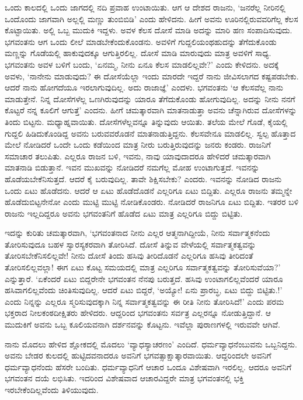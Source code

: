 ಒಂದು ಕಾಲದಲ್ಲಿ ಒಂದು ಜಾಗದಲ್ಲಿ ನದಿ ಪ್ರವಾಹ ಉಂಟಾಯಿತು. ಆಗ ಆ ದೇಶದ ರಾಜನು, `ಜನರೆಲ್ಲ ನೀರಿನಲ್ಲಿ ಒಂದೊಂದು ಜಾಗವಾಗಿ ಅಲ್ಲಲ್ಲಿ ಮಣ್ಣು ತುಂಬಿಬಿಡಿ' ಎಂದು ಹೇಳಿದನು. ಹೀಗೆ ಅವನು ಊರಿನಲ್ಲಿರುವವರಿಗೆಲ್ಲ ಕೆಲಸ ಕೊಟ್ಟಾಯಿತು. ಅಲ್ಲಿ ಒಬ್ಬ ಮುದುಕಿ ಇದ್ದಳು. ಅವಳ ಕೆಲಸ ದೋಸೆ ಮಾಡಿ ಅದನ್ನು ಮಾರಿ ಹಣ ಸಂಪಾದಿಸುವುದು. ಭಗವಂತನು ಆಗ ಒಂದು ಲೀಲೆ ಮಾಡಬೇಕೆಂದುಕೊಂಡನು. ಅವಳಿಗೆ ಗುದ್ದಲಿಯಂಥಹುದನ್ನು ತೆಗೆದುಕೊಂಡು ಮಣ್ಣನ್ನು ಗೊಡೆಯಲ್ಲಿ ಹಾಕುವುದಕ್ಕೂ ಆಗುತ್ತಿರಲಿಲ್ಲ. ದೋಸೆ ಮಾಡಿ ಮಾರುವುದು ಮಾತ್ರ ಅವಳಿಗೆ ಸಾಧ್ಯ. ಭಗವಂತನು ಅವಳ ಬಳಿಗೆ ಬಂದು, `ಏನಮ್ಮ, ನೀನು ಏನೂ ಕೆಲಸ ಮಾಡಲಿಲ್ಲವೇ?' ಎಂದು ಕೇಳಿದನು. ಅದಕ್ಕೆ ಅವಳು, `ನಾನೇನು ಮಾಡುವುದು? ಈ ದೋಸೆಯೆಲ್ಲಾ ಇಂದು ಮಾರದೇ ಇದ್ದರೆ ನಾನು ಜೀವಿಸಲಾಗದ ಕಷ್ಟಪಡಬೇಕು. ಆದರೆ ನಾನು ಹೋಗದೆಯೂ ಇರಲಾಗುವುದಿಲ್ಲ. ಅದು ರಾಜಾಜ್ಞೆ' ಎಂದಳು. ಭಗವಂತನು `ಆ ಕೆಲಸವೆಲ್ಲ ನಾನು ಮಾಡುತ್ತೇನೆ. ನಿನ್ನ ದೋಸೆಗಳೆಲ್ಲ ಒಣಗಿರುವುದನ್ನು ಯಾರೂ ತೆಗೆದುಕೊಂಡು ಹೋಗುವುದಿಲ್ಲ. ಅದನ್ನು ನೀನು ನನಗೆ ಕೊಟ್ಟರೆ ನನ್ನ ಕೂಲಿಗೆ ಆಗುತ್ತೆ' ಎಂದನು. ಹೀಗೆ ಚಮತ್ಕಾರವಾಗಿ ಮಾತನಾಡುತ್ತಾ ಅವನು ಚೆನ್ನಾಗಿರುವ ದೋಸೆಗಳನ್ನು ತಿಂದು ಬಿಟ್ಟನು. ಮಧ್ಯಾಹ್ನವಾಯಿತು. ದೋಸೆಗಳೆಲ್ಲವನ್ನೂ ತಿನ್ನುವುದು ಆಯಿತು. ತಲೆಯ ಮೇಲೆ ಗೊಡೆ, ಕೈಯಲ್ಲಿ ಗುದ್ದಲಿ ಹಿಡಿದುಕೊಂಡಿದ್ದ ಅವನು ಬರುವವರೊಡನೆ ಮಾತನಾಡುತ್ತಿದ್ದನು. ಕೆಲಸವೇನೂ ಮಾಡಲಿಲ್ಲ. ಸ್ವಲ್ಪ ಹೊತ್ತಾದ ಮೇಲೆ ನೋಡಿದರೆ ಒಂದೇ ಒಂದು ಕಡೆಯಿಂದ ಮಾತ್ರ ನೀರು ಬರುತ್ತಿರುವುದನ್ನು ಜನರು ಕಂಡರು. ರಾಜನಿಗೆ ಸಮಾಚಾರ ತಲುಪಿತು. ಎಲ್ಲರೂ ರಾಜನ ಬಳಿ, ಇವನು, ನಾವು ಯಾವುದಾದರೂ ಹೇಳಿದರೆ ಚಮತ್ಕಾರವಾಗಿ ಮಾತನಾಡಿ ಬಿಡುತ್ತಾನೆ. ಇವನ ಮುಖವನ್ನು ನೋಡಿದರೆ ನಮಗೆಲ್ಲ ಮೋಹ ಉಂಟಾಗುತ್ತದೆ. ಇವನನ್ನು ಹೊಡೆಯಬೇಕೆನಿಸುತ್ತದೆ. ಆದರೆ ಕೈ ಬರುವುದಿಲ್ಲ. ತಾವೇ ಶಿಕ್ಷಿಸಬೇಕು? ಎಂದರು. ಇವನನ್ನು ನೋಡಿದ ರಾಜನು ಒಂದು ಏಟು ಹೊಡೆದನು. ಆದರೆ ಆ ಏಟು ಹೊಡೆದೊಡನೆ ಎಲ್ಲರಿಗೂ ಏಟು ಬಿದ್ದಿತು. ಎಲ್ಲರೂ ರಾಜನು ತಮ್ಮನ್ನೇ ಹೊಡೆದುಬಿಟ್ಟನೇನೋ ಎಂದು ಮುಟ್ಟಿ ಮುಟ್ಟಿ ನೋಡಿಕೊಂಡರು. ನೋಡಿದರೆ ರಾಜನಿಗೂ ಏಟು ಬಿದ್ದಿತು. ಇತರರ ಬಳಿ ರಾಜನು ಇಲ್ಲದಿದ್ದರೂ ಅವನು ಭಗವಂತನಿಗೆ ಹೊಡೆದ ಏಟು ಮಾತ್ರ ಎಲ್ಲರಿಗೂ ಬಿದ್ದು ಬಿಟ್ಟಿತು.

ಇದನ್ನು ಕುರಿತು ಚಮತ್ಕಾರವಾಗಿ, `ಭಗವಂತನಾದ ನೀನು ಎಲ್ಲರ ಆತ್ಮನಾಗಿದ್ದೀಯೆ, ನೀನು ಸರ್ವಾತ್ಮಕನೆಂದು ತೋರಿಸುವುದೂ ಬಹಳ ಸ್ವಾರಸ್ಯಕರವಾಗಿ ತೋರಿಸಿದೆ. ದೋಸೆ ತಿನ್ನುವ ವೇಳೆಯಲ್ಲಿ ಸರ್ವಾತ್ಮಕತ್ವವನ್ನು ತೋರಿಸಬೇಕೆನಿಸಲಿಲ್ಲವೇ! ನೀನು ದೋಸೆ ತಿಂದು ಹಸಿವು ತೀರಿದೊಡನೆ ಎಲ್ಲರಿಗೂ ಹಸಿವು ತೀರಿದಂತೆ ತೋರಿಸಲಿಲ್ಲವಲ್ಲಾ! ಈಗ ಏಟು ಕೊಟ್ಟ ಸಮಯದಲ್ಲಿ ಮಾತ್ರ ಎಲ್ಲರಿಗೂ ಸರ್ವಾತ್ಮಕತ್ವವನ್ನು ತೋರಿಸುವೆಯಾ?' ಎನ್ನುತ್ತಾರೆ. `ಏಕೆಂದರೆ ಏಟು ಬಿದ್ದರೇನೇ ಭಗವಂತನ ನೆನಪು ಬರುತ್ತದೆ. ಹಸಿವು ಉಂಟಾಗಲಿಲ್ಲವೆಂದರೆ ಯಾರೂ ಹಸಿವಾಗಲಿಲ್ಲವೆಂದು ಚಿಂತಿಸುವುದಿಲ್ಲ. ಆದರೆ ಏಟು ಬಿದ್ದರೆ, `ಅಯ್ಯೋ! ಏನು ಪ್ರಾರಬ್ಧ, ಏಟು ಬಿದ್ದು ಬಿಟ್ಟಿತು.!' ಎಂದು ನಿನ್ನನ್ನು ಎಲ್ಲರೂ ಸ್ಮರಿಸುವುದಕ್ಕಾಗಿ ನಿನ್ನ ಸರ್ವಾತ್ಮಕತ್ವವನ್ನು ಈ ರೀತಿ ನೀನು ತೋರಿಸಿದೆ!' ಎಂದು ಪರಮ ಭಕ್ತರಾದ ನೀಲಕಂಠದೀಕ್ಷಿತರು ಹೇಳಿದರು. ಆದ್ದರಿಂದ ಭಗವಂತನು ಸರ್ವತ್ರ ಎಲ್ಲರನ್ನೂ ನೋಡುತ್ತಿದ್ದಾನೆ. ಆ ಮುದುಕಿಗೆ ಅವನು ಒಬ್ಬ ಕೂಲಿಯವನಾಗಿ ದರ್ಶನವನ್ನು ಕೊಟ್ಟನು. ಇವೆಲ್ಲಾ ಪುರಾಣಗಳಲ್ಲಿ ಇರುವವೇ ಆಗಿವೆ.

ನಾನು ಮೊದಲು ಹೇಳಿದ ಶ್ಲೋಕದಲ್ಲಿ ಮೊದಲು `ವ್ಯಾಧಸ್ಯಾಚರಣಂ' ಎಂದಿದೆ. ಧರ್ಮವ್ಯಾಧನೆಂಬುವನು ಒಬ್ಬನಿದ್ದನು. ಅವನು ಬೇಡರ ಕುಲದಲ್ಲಿ ಹುಟ್ಟಿದವನಾದರೂ ಅವನಿಗೆ ಭಗವತ್ಸಾಕ್ಷಾತ್ಕಾರವಾಯಿತು. ಆದ್ದರಿಂದಲೇ ಅವನಿಗೆ ಧರ್ಮವ್ಯಾಧನೆಂದು ಹೆಸರೇ ಬಂದಿತು. ಧರ್ಮವ್ಯಾಧನಿಗೆ ಆಚಾರ ಒಂದೂ ವಿಶೇಷವಾಗಿ ಇರಲಿಲ್ಲ. ಆದರೂ ಅವನಿಗೆ ಭಗವಂತನ ದಯೆ ಲಭಿಸಿತು. ಇದರಿಂದ ವಿಶೇಷವಾದ ಆಚಾರವಿದ್ದರೇ ಮಾತ್ರ ಭಗವಂತನಲ್ಲಿ ಭಕ್ತಿ ಇರಬೇಕೆಂದಿಲ್ಲವೆಂದು ತಿಳಿಯುವುದು.


